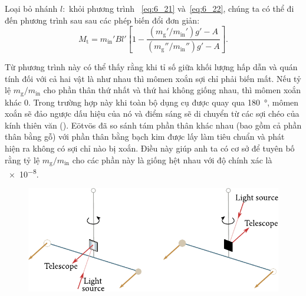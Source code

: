 \noindent
Loại bỏ nhánh $l:$ khỏi phương trình ~\eqref{eq:6_21} và~\eqref{eq:6_22}, chúng ta có thể đi đến phương trình sau sau các phép biến đổi đơn giản:
\begin{equation*}
	M_{\text{t}} = m_{\text{in}}'Bl' \left[1 - \frac{(m_{\text{g}}'/m_{\text{in}}') g' - A}{(m_{\text{g}}''/m_{\text{in}}'') g' - A} \right].
\end{equation*}

\noindent
Từ phương trình này có thể thấy rằng khi tỉ số giữa khối lượng hấp dẫn và quán tính đối với cả hai vật là như nhau thì mômen xoắn sợi chỉ phải biến mất. Nếu tỷ lệ $m_{\text{g}}/m_{\text{in}}$ cho phần thân thứ nhất và thứ hai không giống nhau, thì mômen xoắn khác 0. Trong trường hợp này khi toàn bộ dụng cụ được quay qua \SI{180}{\degree}, mômen xoắn sẽ đảo ngược dấu hiệu của nó và điểm sáng sẽ di chuyển từ các sợi chéo của kính thiên văn (). E\"{o}tv\"{o}s đã so sánh tám phần thân khác nhau (bao gồm cả phần thân bằng gỗ) với phần thân bằng bạch kim được lấy làm tiêu chuẩn và phát hiện ra không có sợi chỉ nào bị xoắn. Điều này giúp anh ta có cơ sở để tuyên bố rằng tỷ lệ $m_{\text{g}}/m_{\text{in}}$ cho các phần này là giống hệt nhau với độ chính xác là \num{e-8}.
\begin{figure}[!htb]
	\begin{center}
		\includegraphics[scale=0.95]{figures/ch_06/fig_6_7.pdf}
		\caption[]{}
		\label{fig:6_7}
	\end{center}
\end{figure}

